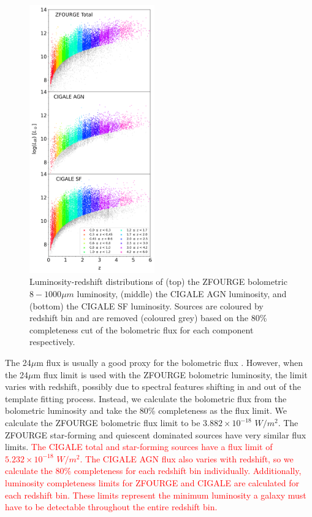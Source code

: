 \begin{figure}
    \centering
    \includegraphics[width=0.48\textwidth]{Figures/LIR vs Z.png}
    \caption{Luminosity-redshift distributions of (top) the ZFOURGE bolometric $8-1000\mu m$ luminosity, (middle) the CIGALE AGN luminosity, and (bottom) the CIGALE SF luminosity. Sources are coloured by redshift bin and are removed (coloured grey) based on the 80\% completeness cut of the bolometric flux for each component respectively.}
    \label{Fig: ZF Lum vs z}
\end{figure}

The 24$\mu$m flux is usually a good proxy for the bolometric flux \citep{rodighiero_mid-_2010}. However, when the 24$\mu$m flux limit is used with the ZFOURGE bolometric luminosity, the limit varies with redshift, possibly due to spectral features shifting in and out of the template fitting process. Instead, we calculate the bolometric flux from the bolometric luminosity and take the 80\% completeness as the flux limit. We calculate the ZFOURGE bolometric flux limit to be $3.882\times10^{-18}$ $W/m^2$. The ZFOURGE star-forming and quiescent dominated sources have very similar flux limits. \textcolor{red}{The CIGALE total and star-forming sources have a flux limit of $5.232\times10^{-18}$ $W/m^2$. The CIGALE AGN flux also varies with redshift, so we calculate the 80\% completeness for each redshift bin individually. Additionally, luminosity completeness limits for ZFOURGE and CIGALE are calculated for each redshift bin. These limits represent the minimum luminosity a galaxy must have to be detectable throughout the entire redshift bin.}
